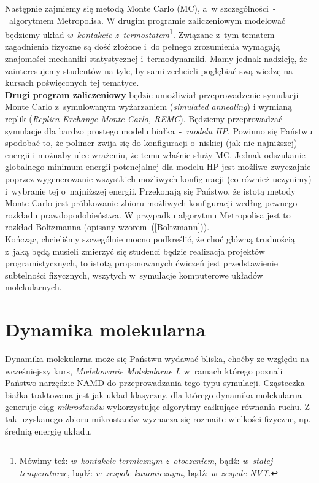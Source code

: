 \documentclass[a4paper,11pt,twoside]{book}
\begin{document}
Następnie zajmiemy się metodą Monte Carlo (MC), a~w szczególności~-~algorytmem Metropolisa. W drugim programie zaliczeniowym modelować będziemy układ \emph{w~kontakcie z~termostatem}\footnote{Mówimy też: \emph{w~kontakcie termicznym z~otoczeniem}, bądź: \emph{w~stałej temperaturze}, bądź: \emph{w~zespole kanonicznym}, bądź: \emph{w~zespole \emph{NVT}}.}. Związane z~tym tematem zagadnienia fizyczne są dość złożone i~do pełnego zrozumienia wymagają znajomości mechaniki statystycznej i~termodynamiki. Mamy jednak nadzieję, że zainteresujemy studentów na tyle, by sami zechcieli pogłębiać swą wiedzę na kursach poświęconych tej tematyce.\\

{\bf Drugi program zaliczeniowy} będzie umożliwiał przeprowadzenie symulacji Monte Carlo z~symulowanym wyżarzaniem (\emph{simulated annealing}) i wymianą replik (\emph{Replica Exchange Monte Carlo, REMC}). Będziemy przeprowadzać symulacje dla bardzo prostego modelu białka~-~\emph{modelu HP}. Powinno się Państwu spodobać to, że polimer zwija się do konfiguracji o~niskiej (jak nie najniższej) energii i możnaby ulec wrażeniu, że temu właśnie służy MC. Jednak odszukanie globalnego minimum energii potencjalnej dla modelu HP jest możliwe zwyczajnie poprzez wygenerowanie wszystkich możliwych konfiguracji (co również uczynimy) i~wybranie tej o~najniższej energii. Przekonają się Państwo, że istotą metody Monte Carlo jest próbkowanie zbioru możliwych konfiguracji według pewnego rozkładu prawdopodobieństwa. W przypadku algorytmu Metropolisa jest to rozkład Boltzmanna (opisany wzorem~(\ref{Boltzmann})).\\ 

Kończąc, chcieliśmy szczególnie mocno podkreślić, że choć główną trudnością z~jaką będą musieli zmierzyć się studenci będzie realizacja projektów programistycznych, to istotą proponowanych ćwiczeń jest przedstawienie subtelności fizycznych, wszytych w~symulacje komputerowe układów molekularnych.
\section{Dynamika molekularna} 
Dynamika molekularna może się Państwu wydawać bliska, choćby ze względu na wcześniejszy kurs, \emph{Modelowanie Molekularne I}, w~ramach którego poznali Państwo narzędzie NAMD do przeprowadzania tego typu symulacji. Cząsteczka białka traktowana jest jak układ klasyczny, dla którego dynamika molekularna generuje ciąg \emph{mikrostanów} wykorzystując algorytmy całkujące równania ruchu. Z tak uzyskanego zbioru mikrostanów wyznacza się rozmaite wielkości fizyczne, np. średnią energię układu.\\
\end{document}
